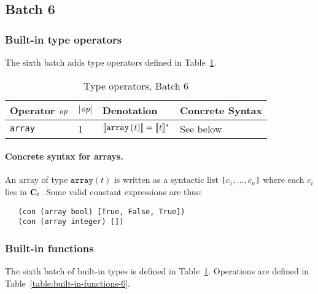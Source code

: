 \renewcommand{\note}[1]{
  \bigskip
  \refstepcounter{notenumberF}
  \noindent\textbf{Note \thenotenumberF. #1}
}
\newpage
\subsection{Batch 6}
\label{sec:default-builtins-6}

\subsubsection{Built-in type operators}
\label{sec:built-in-type-operators-6}
The sixth batch adds type operators defined in Table~\ref{table:built-in-type-operators-6}. 

\begin{table}[H]
  \centering
    \begin{tabular}{|l|p{14mm}|l|l|}
        \hline
        Operator $\textit{op}$ & $\left|\textit{op}\right|$  & Denotation & Concrete Syntax\\
        \hline
        \texttt{array} 
          & 1 
          & $\llbracket\mathit{\mathtt{array}\,\mathtt{(}t\mathtt{)}}\rrbracket = \llbracket\mathit{t}\rrbracket^*$ 
          & See below\\
        \hline
        \end{tabular}
   \caption{Type operators, Batch 6}
    \label{table:built-in-type-operators-6}
\end{table}

\paragraph{Concrete syntax for arrays.}
An array of type $\texttt{array}(t)$ is written as a syntactic list
\texttt{[$c_1, \ldots, c_n$]} where each $c_i$ lies in $\mathbf{C}_t$.
Some valid constant expressions are thus:
\begin{verbatim}
   (con (array bool) [True, False, True])
   (con (array integer) [])
\end{verbatim}

\subsubsection{Built-in functions}
\label{sec:built-in-functions-6}
The sixth batch of built-in types is defined in Table~\ref{table:built-in-type-operators-6}.
Operations are defined in Table~\ref{table:built-in-functions-6}.

